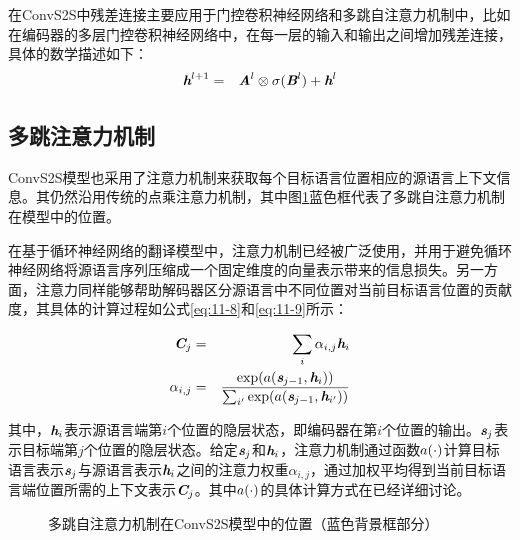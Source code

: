 \parinterval 在ConvS2S中残差连接主要应用于门控卷积神经网络和多跳自注意力机制中，比如在编码器的多层门控卷积神经网络中，在每一层的输入和输出之间增加残差连接，具体的数学描述如下：
\begin{eqnarray}
\textbf{\em h}^{l+1} &=& \textbf{\em A}^{l} \otimes \sigma ( \textbf{\em B}^{l} ) + \textbf{\em h}^{l}
\label{eq:11-7}
\end{eqnarray}


\subsection{多跳注意力机制}

\parinterval ConvS2S模型也采用了注意力机制来获取每个目标语言位置相应的源语言上下文信息。其仍然沿用传统的点乘注意力机制，其中图\ref{fig:11-16}蓝色框代表了多跳自注意力机制在模型中的位置。

\parinterval 在基于循环神经网络的翻译模型中，注意力机制已经被广泛使用，并用于避免循环神经网络将源语言序列压缩成一个固定维度的向量表示带来的信息损失。另一方面，注意力同样能够帮助解码器区分源语言中不同位置对当前目标语言位置的贡献度，其具体的计算过程如公式\eqref{eq:11-8}和\eqref{eq:11-9}所示：

\begin{eqnarray}
\textbf{\em C}_j &=& \sum_i \alpha_{i,j} \textbf{\em h}_i \label{eq:11-8} \\
\alpha_{i,j} &=& \frac{ \textrm{exp}({a} (\textbf{\em s}_{j-1},\textbf{\em h}_i))  }{\sum_{i'} \textrm{exp}( {a} (\textbf{\em s}_{j-1},\textbf{\em h}_{i'}))} \label{eq:11-9}
\end{eqnarray}

\noindent 其中，$\textbf{\em h}_i$表示源语言端第$i$个位置的隐层状态，即编码器在第$i$个位置的输出。$\textbf{\em s}_j$表示目标端第$j$个位置的隐层状态。给定$\textbf{\em s}_j$和$\textbf{\em h}_i$，注意力机制通过函数${a}(\cdot)$计算目标语言表示$\textbf{\em s}_j$与源语言表示$\textbf{\em h}_i$之间的注意力权重$\alpha_{i,j}$，通过加权平均得到当前目标语言端位置所需的上下文表示$\textbf{\em C}_j$。其中${a}(\cdot)$的具体计算方式在{\chapterten}已经详细讨论。

\begin{figure}[htp]
\centering

\caption{多跳自注意力机制在ConvS2S模型中的位置（蓝色背景框部分）}
\label{fig:11-16}
\end{figure}

